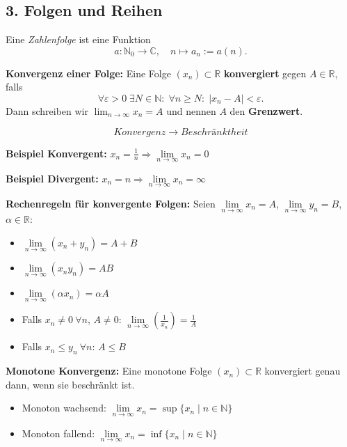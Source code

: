 \subsection{3. Folgen und Reihen}  
Eine \emph{ Zahlenfolge} ist eine Funktion  
\[
a : \mathbb{N}_0 \to \mathbb{C}, \quad n \mapsto a_n := a(n).
\]  

\textbf{Konvergenz einer Folge:}  
Eine Folge \( (x_n) \subset \mathbb{R} \) \textbf{konvergiert} gegen \( A \in \mathbb{R} \), falls  
\[
\forall \varepsilon > 0\; \exists N \in \mathbb{N}:\; \forall n \geq N:\; |x_n - A| < \varepsilon.
\]  
Dann schreiben wir \( \lim_{n \to \infty} x_n = A \) und nennen \( A \) den \textbf{Grenzwert}.

\[
Konvergenz \to Beschränktheit
\]  

\textbf{Beispiel Konvergent:} \( x_n = \frac{1}{n} \Rightarrow \lim\limits_{n \to \infty} x_n = 0 \)

\textbf{Beispiel Divergent:} \( x_n = n \Rightarrow \lim\limits_{n \to \infty} x_n = \infty \)

\textbf{Rechenregeln für konvergente Folgen:}  
Seien \( \lim\limits_{n \to \infty} x_n = A \), \( \lim\limits_{n \to \infty} y_n = B \), \( \alpha \in \mathbb{R} \):

\begin{itemize}
  \item \( \lim\limits_{n \to \infty} (x_n + y_n) = A + B \)
  \item \( \lim\limits_{n \to \infty} (x_n y_n) = AB \)
  \item \( \lim\limits_{n \to \infty} (\alpha x_n) = \alpha A \)
  \item Falls \( x_n \neq 0\ \forall n \), \( A \neq 0 \):  
        \( \lim\limits_{n \to \infty} \left( \frac{1}{x_n} \right) = \frac{1}{A} \)
  \item Falls \( x_n \leq y_n\ \forall n \): \( A \leq B \)
\end{itemize}

\textbf{Monotone Konvergenz:}  
Eine monotone Folge \( (x_n) \subset \mathbb{R} \) konvergiert genau dann, wenn sie beschränkt ist.

\begin{itemize}
  \item Monoton wachsend:  
  \( \lim\limits_{n \to \infty} x_n = \sup \{ x_n \mid n \in \mathbb{N} \} \)

  \item Monoton fallend:  
  \( \lim\limits_{n \to \infty} x_n = \inf \{ x_n \mid n \in \mathbb{N} \} \)
\end{itemize}


